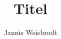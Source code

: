 \documentclass[ngerman]{beamer}
\title{Titel}
\author{Jannis Weisbrodt}
\begin{document}
\begin{frame}
	\maketitle
\end{frame}
\end{document}
